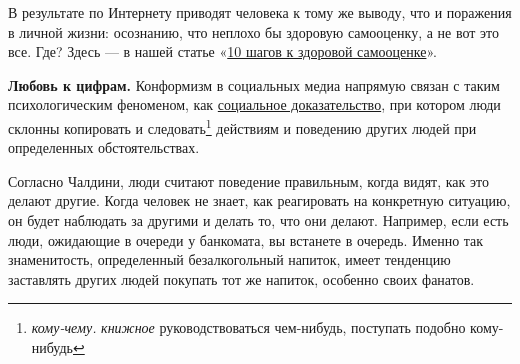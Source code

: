 В результате  по Интернету приводят человека к тому же выводу, что и поражения в личной жизни: осознанию, что неплохо бы  здоровую самооценку, а не вот это все. Где? Здесь --- в нашей статье «\href{https://4brain.ru/blog/10-shagov-k-zdorovoj-samoocenke/}{10 шагов к здоровой самооценке}».

\textbf{Любовь к цифрам.}
Конформизм в социальных медиа напрямую связан с таким психологическим феноменом, как \href{https://4brain.ru/blog/%D0%BF%D1%81%D0%B8%D1%85%D0%BE%D0%BB%D0%BE%D0%B3%D0%B8%D1%8F-%D0%B2%D0%B8%D1%80%D1%83%D1%81%D0%BD%D0%BE%D0%B9-%D1%80%D0%B5%D0%BA%D0%BB%D0%B0%D0%BC%D1%8B/}{социальное доказательство}, при котором люди склонны копировать и следовать\footnote{\textit{кому-чему.} \textit{книжное} руководствоваться чем-нибудь, поступать подобно кому-нибудь} действиям и поведению других людей при определенных обстоятельствах.

Согласно Чалдини, люди считают поведение правильным, когда видят, как это делают другие. Когда человек не знает, как реагировать на конкретную ситуацию, он будет наблюдать за другими и делать то, что они делают. Например, если есть люди, ожидающие в очереди у банкомата, вы встанете в очередь. Именно так знаменитость,   определенный безалкогольный напиток, имеет тенденцию заставлять других людей покупать тот же напиток, особенно своих фанатов.

